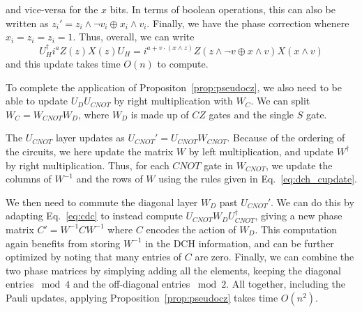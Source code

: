 and vice-versa for the $x$ bits. In terms of boolean operations, this can also be written as $z_{i}'= z_{i}\wedge\neg v_{i} \oplus x_{i}\wedge v_{i}$. Finally, we have the phase correction whenere $x_{i}=z_{i}=z_{i}=1$. Thus, overall, we can write
\begin{equation}
U_{H}^{\dagger}i^{a}Z(z)X(z)U_{H} = i^{a+v\cdot\left(x\wedge z\right)}Z(z\wedge\neg v \oplus x\wedge v)X(x\wedge v)
\label{eq:dch_hupdate}
\end{equation}
and this update takes time $O(n)$ to compute.\par
To complete the application of Propositon~\ref{prop:pseudocz}, we also need to be able to update $U_{D}U_{CNOT}$ by right multiplication with $W_{C}$. We can split $W_{C}=W_{CNOT}W_{D}$, where $W_{D}$ is made up of $CZ$ gates and the single $S$ gate.\par
The $U_{CNOT}$ layer updates as $U_{CNOT}'=U_{CNOT}W_{CNOT}$. Because of the ordering of the circuits, we here update the matrix $W$ by left multiplication, and update $W^{\dagger}$ by right multiplication. Thus, for each $CNOT$ gate in $W_{CNOT}$, we update the columns of $W^{-1}$ and the rows of $W$ using the rules given in Eq.~\ref{eq:dch_cupdate}.\par
We then need to commute the diagonal layer $W_{D}$ past $U_{CNOT}'$. We can do this by adapting Eq.~\ref{eq:cdc} to instead compute $U_{CNOT}W_{D}U_{CNOT}^{\dagger}$, giving a new phase matrix $C'=W^{-1}CW^{-1}$ where $C$ encodes the action of $W_{D}$. This computation again benefits from storing $W^{-1}$ in the DCH information, and can be further optimized by noting that many entries of $C$ are zero. Finally, we can combine the two phase matrices by simplying adding all the elements, keeping the diagonal entries $\bmod 4$ and the off-diagonal entries $\bmod 2$. All together, including the Pauli updates, applying Proposition~\ref{prop:pseudocz} takes time $O(n^2)$.
